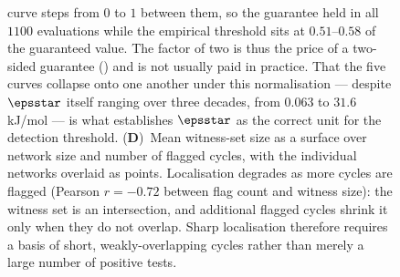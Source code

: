 \begin{figure}[!htbp]
{    curve steps from $0$ to $1$ between them, so the guarantee held in
    all $1100$ evaluations while the empirical threshold sits at
    $0.51$--$0.58$ of the guaranteed value.
    The factor of two is thus the price of a two-sided guarantee
    () and is not usually paid in practice.
    That the five curves collapse onto one another under this
    normalisation --- despite $\epsstar$ itself ranging over three
    decades, from $0.063$ to $31.6$ kJ/mol --- is what establishes
    $\epsstar$ as the correct unit for the detection threshold.
    (\textbf{D})~Mean witness-set size as a surface over network size
    and number of flagged cycles, with the individual networks
    overlaid as points.
    Localisation degrades as more cycles are flagged (Pearson
    $r = -0.72$ between flag count and witness size): the witness set is
    an intersection, and additional flagged cycles shrink it only when
    they do not overlap.
    Sharp localisation therefore requires a basis of short,
    weakly-overlapping cycles rather than merely a large number of
    positive tests.}
    \label{fig:tol_panel4}
\end{figure}
